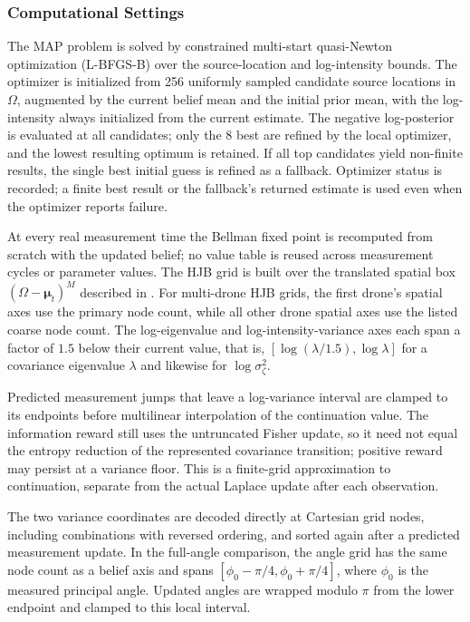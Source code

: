 \documentclass{article}
\newcommand{\bs}[1]{\boldsymbol{#1}}
\begin{document}
\subsubsection{Computational Settings}
\label{sec:computational_settings}

The MAP problem is solved by constrained multi-start quasi-Newton optimization (L-BFGS-B) over the source-location and log-intensity bounds.
The optimizer is initialized from 256 uniformly sampled candidate source locations in $\Omega$, augmented by the current belief mean and the initial prior mean, with the log-intensity always initialized from the current estimate.
The negative log-posterior is evaluated at all candidates; only the 8 best are refined by the local optimizer, and the lowest resulting optimum is retained.
If all top candidates yield non-finite results, the single best initial guess is refined as a fallback.
Optimizer status is recorded; a finite best result or the fallback's returned estimate is used even when the optimizer reports failure.

At every real measurement time the Bellman fixed point is recomputed from scratch with the updated belief; no value table is reused across measurement cycles or parameter values.
The HJB grid is built over the translated spatial box $(\Omega-\bs\mu_t)^M$ described in .
For multi-drone HJB grids, the first drone's spatial axes use the primary node count, while all other drone spatial axes use the listed coarse node count.
The log-eigenvalue and log-intensity-variance axes each span a factor of $1.5$ below their current value, that is, $[\log(\lambda/1.5),\log\lambda]$ for a covariance eigenvalue $\lambda$ and likewise for $\log\sigma_\zeta^2$.

Predicted measurement jumps that leave a log-variance interval are clamped to its endpoints before multilinear interpolation of the continuation value.
The information reward still uses the untruncated Fisher update, so it need not equal the entropy reduction of the represented covariance transition; positive reward may persist at a variance floor.
This is a finite-grid approximation to continuation, separate from the actual Laplace update after each observation.

The two variance coordinates are decoded directly at Cartesian grid nodes, including combinations with reversed ordering, and sorted again after a predicted measurement update.
In the full-angle comparison, the angle grid has the same node count as a belief axis and spans $[\phi_0-\pi/4,\phi_0+\pi/4]$, where $\phi_0$ is the measured principal angle.
Updated angles are wrapped modulo $\pi$ from the lower endpoint and clamped to this local interval.
\end{document}
